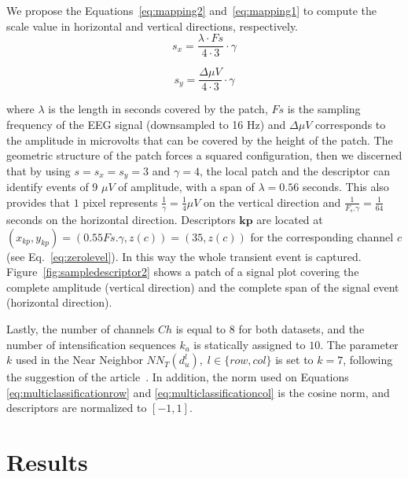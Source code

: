 \documentclass[utf8]{frontiersSCNS} %
\begin{document}
We propose the Equations~\ref{eq:mapping2} and~\ref{eq:mapping1} to compute the scale value in horizontal and vertical directions, respectively. 
\begin{equation}
s_x = \frac{\lambda \cdot Fs}{4 \cdot 3} \cdot \gamma
\label{eq:mapping2}
\end{equation}

\begin{equation}
s_y= \frac{\Delta \mu V}{4 \cdot 3} \cdot \gamma 
\label{eq:mapping1}
\end{equation}


\noindent where $ \lambda $ is the length in seconds covered by the patch, $ Fs $ is the sampling frequency of the EEG signal (downsampled to 16 Hz) and  $\Delta  \mu V $ corresponds to the amplitude in microvolts that can be covered by the height of the patch. The geometric structure of the patch forces a squared configuration, then we discerned that by using $ s =s_x =s_y = 3 $ and $ \gamma = 4 $,  the local patch and the descriptor can identify events of 9 $ \mu V $ of amplitude, with a span of $ \lambda = 0.56$ seconds.  This also provides that $ 1 $ pixel represents $ \frac{1}{\gamma}= \frac{1}{4} \mu V $ on the vertical direction and $\frac{1}{F_s.\gamma}=\frac{1}{64}$ seconds on the horizontal direction. Descriptors  $\mathbf{kp}$  are located at $ (x_{kp}, y_{kp} )= ( 0.55 Fs.\gamma, z(c) )= (35,  z(c)) $ for the corresponding channel $c$ (see Eq.~\ref{eq:zerolevel}).   In this way the whole transient event is captured. 
Figure~\ref{fig:sampledescriptor2} shows a patch of a signal plot covering the complete amplitude (vertical direction) and the complete span of the signal event (horizontal direction). 

Lastly, the number of channels $Ch$ is equal to $8$ for both datasets, and the number of intensification sequences $k_a$ is statically assigned to $10$.  The parameter $k$ used in the Near Neighbor $NN_T(d^l_u), \;l\in\{row,{col}\}$ is set to $k=7$, following the suggestion of the article~\citep{Boiman2008}.  In addition, the norm used on  Equations \ref{eq:multiclassificationrow} and \ref{eq:multiclassificationcol} is the cosine norm, and descriptors are normalized to $ \left[ -1, 1 \right] $.

\section{Results} \label{Results}
\label{section:results}
\end{document}
